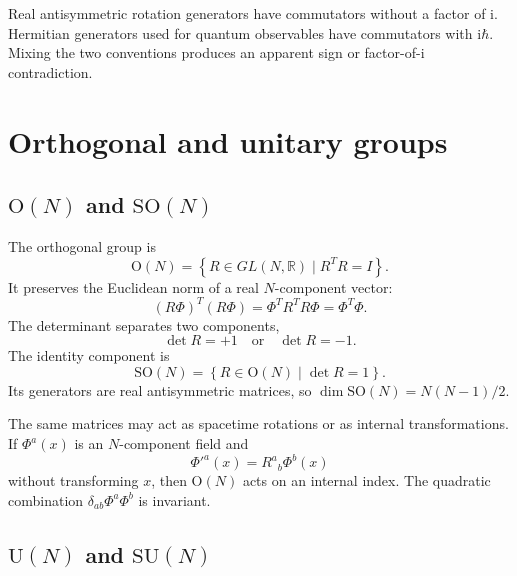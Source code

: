 \documentclass[11pt]{article}
\newcommand{\ii}{\mathrm{i}}
\newcommand{\R}{\mathbb{R}}
\newcommand{\SO}{\mathrm{SO}}
\newcommand{\OO}{\mathrm{O}}
\newcommand{\UU}{\mathrm{U}}
\newcommand{\SU}{\mathrm{SU}}
\begin{document}
\begin{warningbox}
Real antisymmetric rotation generators have commutators without a factor of
$\ii$.  Hermitian generators used for quantum observables have commutators
with $\ii\hbar$.  Mixing the two conventions produces an apparent sign or
factor-of-$\ii$ contradiction.
\end{warningbox}

\section{Orthogonal and unitary groups}

\subsection{\texorpdfstring{$\OO(N)$}{O(N)} and
\texorpdfstring{$\SO(N)$}{SO(N)}}

The orthogonal group is
\begin{equation}
  \OO(N)=\left\{R\in GL(N,\R)\mid R^TR=I\right\}.
  \label{eq:ONdefinition}
\end{equation}
It preserves the Euclidean norm of a real $N$-component vector:
\begin{equation}
  (R\Phi)^T(R\Phi)=\Phi^TR^TR\Phi=\Phi^T\Phi.
  \label{eq:ONinvariant}
\end{equation}
The determinant separates two components,
\begin{equation}
  \det R=+1\quad\text{or}\quad\det R=-1.
\end{equation}
The identity component is
\begin{equation}
  \SO(N)=\left\{R\in\OO(N)\mid\det R=1\right\}.
  \label{eq:SONdefinition}
\end{equation}
Its generators are real antisymmetric matrices, so
$\dim\SO(N)=N(N-1)/2$.

The same matrices may act as spacetime rotations or as internal
transformations.  If $\Phi^a(x)$ is an $N$-component field and
\begin{equation}
  \Phi'^a(x)=R^a{}_b\Phi^b(x)
  \label{eq:internalON}
\end{equation}
without transforming $x$, then $\OO(N)$ acts on an internal index.  The
quadratic combination $\delta_{ab}\Phi^a\Phi^b$ is invariant.

\subsection{\texorpdfstring{$\UU(N)$}{U(N)} and
\texorpdfstring{$\SU(N)$}{SU(N)}}
\end{document}
